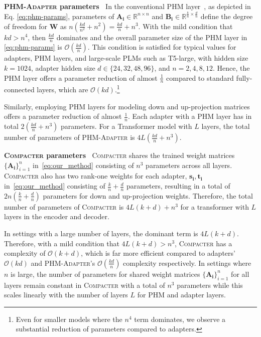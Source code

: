  \textbf{\textsc{PHM-Adapter} parameters} $\:$ In the conventional PHM layer~\citep{zhang2021beyond}, as depicted in Eq. \eqref{eq:phm-params}, parameters of $\bm{A_i}\in\mathbb{R}^{n\times n}$ and $\bm{B_i}\in\mathbb{R}^{\frac{k}{n}\times \frac{d}{n}}$ define the degree of freedom for $\bm{W}$ as $n(\frac{kd}{n^2}+n^2)=\frac{kd}{n}+n^3$.  With the mild condition that $kd > n^4$, then $\frac{kd}{n}$ dominates and the overall parameter size of the PHM layer in \eqref{eq:phm-params} is $\mathcal{O}(\frac{kd}{n})$. This condition is satisfied for typical values for adapters, PHM layers, and large-scale PLMs such as T5-large, with hidden size $k = 1024$, adapter hidden size $d\in\{24, 32, 48, 96\}$, and $n = 2,4,8,12$. Hence, the PHM layer offers a parameter reduction of almost $\frac{1}{n}$ compared to standard fully-connected layers, which are $\mathcal{O}(kd)$.\footnote{Even for smaller models where the $n^4$ term dominates, we observe a substantial reduction of parameters compared to adapters.} 

Similarly, employing PHM layers for modeling down and up-projection matrices offers a parameter reduction of almost $\frac{1}{n}$. Each adapter with a PHM layer has in total $2(\frac{kd}{n}+n^3)$ parameters. For a Transformer model with $L$ layers, the total number of parameters of \textsc{PHM-Adapter} is $4L(\frac{kd}{n}+n^3)$. 

 \textbf{\textsc{Compacter} parameters} $\:$ \textsc{Compacter} shares the trained weight matrices $\{\bm{A_i}\}_{i=1}^n$ in~\eqref{eq:our_method} consisting of $n^3$ parameters across all layers. \textsc{Compacter} also has two rank-one weights for each adapter, $\bm{s_i},\bm{t_i}$ in~\eqref{eq:our_method} consisting of $\frac{k}{n}+\frac{d}{n}$ parameters, resulting in a total of $2n(\frac{k}{n}+\frac{d}{n})$ parameters for down and up-projection weights. Therefore, the total number of parameters of \textsc{Compacter} is $4L(k+d) + n^3$ for a transformer with $L$ layers in the encoder and decoder.

In settings with a large number of layers, the dominant term is $4L(k+d)$. Therefore, with a mild condition that $4L(k+d)>n^3$, \textsc{Compacter} has a complexity of $\mathcal{O}(k+d)$, which is far more efficient compared to adapters' $\mathcal{O}(kd)$ and \textsc{PHM-Adapter}'s $\mathcal{O}(\frac{kd}{n})$ complexity respectively. In settings where $n$ is large, the number of parameters for shared weight matrices $\{\bm{A_i}\}_{i=1}^n$ for all layers remain constant in \textsc{Compacter} with a total of $n^3$ parameters while this scales linearly with the number of layers $L$ for PHM and adapter layers.

